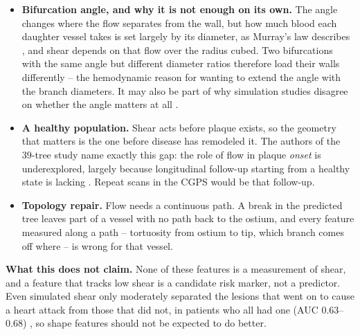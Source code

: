 \begin{itemize}
  \item \textbf{Bifurcation angle, and why it is not enough on its own.} The angle changes where the
    flow separates from the wall, but how much blood each daughter vessel takes is set largely by
    its diameter, as Murray's law describes \cite{taylor2024murray}, and shear depends on that flow
    over the radius cubed. Two bifurcations with the same angle but different diameter ratios
    therefore load their walls differently -- the hemodynamic reason for wanting to extend the angle
    with the branch diameters. It may also be part of why simulation studies disagree on whether the
    angle matters at all \cite{shen2026geometry}.

  \item \textbf{A healthy population.} Shear acts before plaque exists, so the geometry that matters
    is the one before disease has remodeled it. The authors of the 39-tree study name exactly this
    gap: the role of flow in plaque \emph{onset} is underexplored, largely because longitudinal
    follow-up starting from a healthy state is lacking \cite{zhang2024curvature}. Repeat scans in
    the CGPS would be that follow-up.

  \item \textbf{Topology repair.} Flow needs a continuous path. A break in the predicted tree leaves
    part of a vessel with no path back to the ostium, and every feature measured along a path --
    tortuosity from ostium to tip, which branch comes off where -- is wrong for that vessel.
\end{itemize}

\textbf{What this does not claim.}
None of these features is a measurement of shear, and a feature that tracks low shear is a candidate
risk marker, not a predictor. Even simulated shear only moderately separated the lesions that went
on to cause a heart attack from those that did not, in patients who all had one (AUC 0.63--0.68)
\cite{griffo2026wss}, so shape features should not be expected to do better.
